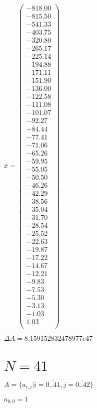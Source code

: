 \documentclass[a4paper,12pt]{article}
\begin{document}
$\bar { x } = \begin{pmatrix}
-818.00 \\
-815.50 \\
-541.33 \\
-403.75 \\
-320.80 \\
-265.17 \\
-225.14 \\
-194.88 \\
-171.11 \\
-151.90 \\
-136.00 \\
-122.58 \\
-111.08 \\
-101.07 \\
-92.27 \\
-84.44 \\
-77.41 \\
-71.06 \\
-65.26 \\
-59.95 \\
-55.05 \\
-50.50 \\
-46.26 \\
-42.29 \\
-38.56 \\
-35.04 \\
-31.70 \\
-28.54 \\
-25.52 \\
-22.63 \\
-19.87 \\
-17.22 \\
-14.67 \\
-12.21 \\
-9.83 \\
-7.53 \\
-5.30 \\
-3.13 \\
-1.03 \\
1.03 \\
\end{pmatrix}
$

$\Delta A = 8.159152832478977e47$



\section{ $N = 41$ }
$A = \{ a _{ i, j } | i = \overline { 0..41 }, j = \overline { 0..42 } \}$

$a _{ 0, 0 } = 1$
\end{document}
